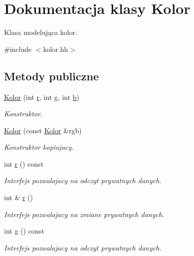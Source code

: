 \hypertarget{class_kolor}{}\section{Dokumentacja klasy Kolor}
\label{class_kolor}


Klasa modelująca kolor.  




{\ttfamily \#include $<$kolor.\+hh$>$}

\subsection*{Metody publiczne}
\begin{DoxyCompactItemize}
\item 
\hyperlink{class_kolor_adde4f304856649a8a148288c271d4775}{Kolor} (int \hyperlink{class_kolor_a1091fbdb6e53516bfb68784e96e58bc1}{r}, int \hyperlink{class_kolor_a4dfa47458440fb136711fb6de6344f61}{g}, int \hyperlink{class_kolor_aa240903064a3d8f49585c34d92b74e5d}{b})
\begin{DoxyCompactList}\small\item\em Konstruktor. \end{DoxyCompactList}\item 
\hyperlink{class_kolor_a79baff3add17cc61abb8bc71f0a426e6}{Kolor} (const \hyperlink{class_kolor}{Kolor} \&rgb)
\begin{DoxyCompactList}\small\item\em Konstruktor kopiujacy. \end{DoxyCompactList}\item 
int \hyperlink{class_kolor_a1091fbdb6e53516bfb68784e96e58bc1}{r} () const 
\begin{DoxyCompactList}\small\item\em Interfejs pozwalajacy na odczyt prywatnych danych. \end{DoxyCompactList}\item 
int \& \hyperlink{class_kolor_a426240b4b7c4364e9d34db265475b4ad}{r} ()
\begin{DoxyCompactList}\small\item\em Interfejs pozwalajacy na zmiane prywatnych danych. \end{DoxyCompactList}\item 
int \hyperlink{class_kolor_a4dfa47458440fb136711fb6de6344f61}{g} () const 
\begin{DoxyCompactList}\small\item\em Interfejs pozwalajacy na odczyt prywatnych danych. \end{DoxyCompactList}\item 

\end{DoxyCompactItemize}
